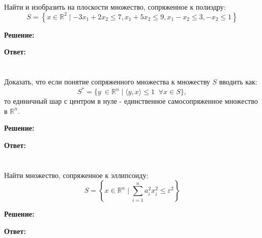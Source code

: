 \documentclass[a4paper,12pt]{article}
\begin{document}
\vspace{\baselineskip}

\section{}

Найти и изобразить на плоскости множество, сопряженное к полиэдру: $$S = \left\{ x \in \mathbb{R}^2 \mid -3x_1 + 2x_2 \le 7, x_1 + 5x_2 \le 9, x_1 - x_2 \le 3, -x_2 \le 1\right\}$$

\vspace{\baselineskip}

\textbf{Решение:}

\vspace{\baselineskip}


\textbf{Ответ:}


\section{}

Доказать, что если понятие сопряженного множества к множеству $S$ вводить как: $$S^* = \{y \ \in \mathbb{R}^n \mid \langle y, x\rangle \le 1 \;\; \forall x \in S\}, $$ то единичный шар с центром в нуле - единственное самосопряженное множество в $\mathbb{R}^n$.

\vspace{\baselineskip}

\textbf{Решение:}

\vspace{\baselineskip}

\textbf{Ответ:}

\section{}

Найти множество, сопряженное к эллипсоиду: $$ S = \left\{ x \in \mathbb{R}^n \mid \sum\limits_{i = 1}^n a_i^2 x_i^2 \le \varepsilon^2 \right\}$$

\vspace{\baselineskip}

\textbf{Решение:}

\vspace{\baselineskip}

\textbf{Ответ:} 
\end{document}
